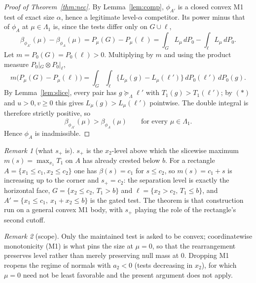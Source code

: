 \documentclass[12pt]{article}
\theoremstyle{remark}
\newtheorem{remark}{Remark}
\newcommand{\Lam}{\Lambda}
\newcommand{\sucL}{\succeq_\Lam}
\begin{document}
\begin{proof}[Proof of Theorem~\ref{thm:nec}]
By Lemma~\ref{lem:comp}, $\phi_{A'}$ is a closed convex M1 test of exact size $\alpha$, hence a legitimate level-$\alpha$ competitor. Its power minus that of $\phi_A$ at $\mu\in\Lam_1$ is, since the tests differ only on $G\cup\ell$,
\[
\beta_{\phi_{A'}}(\mu)-\beta_{\phi_A}(\mu)
=P_\mu(G)-P_\mu(\ell)
=\int_G L_\mu\,dP_0-\int_\ell L_\mu\,dP_0 .
\]
Let $m=P_0(G)=P_0(\ell)>0$. Multiplying by $m$ and using the product measure $P_0|_G\otimes P_0|_\ell$,
\[
m\big(P_\mu(G)-P_\mu(\ell)\big)
=\int_G\!\int_\ell \big\{L_\mu(g)-L_\mu(\ell')\big\}\,dP_0(\ell')\,dP_0(g).
\]
By Lemma~\ref{lem:slice}, every pair has $g\sucL\ell'$ with $T_1(g)>T_1(\ell')$; by $(\ast)$ and $u>0,v\ge0$ this gives $L_\mu(g)>L_\mu(\ell')$ pointwise. The double integral is therefore strictly positive, so
\[
\beta_{\phi_{A'}}(\mu)>\beta_{\phi_A}(\mu)\qquad\text{for every }\mu\in\Lam_1 .
\]
Hence $\phi_A$ is inadmissible.
\end{proof}

\begin{remark}[what $s_+$ is]
$s_+$ is the $x_2$-level above which the slicewise maximum $m(s)=\max_{x_1}T_1$ on $A$ has already crested below $b$. For a rectangle $A=\{x_1\le c_1,x_2\le c_2\}$ one has $\beta(s)=c_1$ for $s\le c_2$, so $m(s)=c_1+s$ is increasing up to the corner and $s_+=c_2$: the separation level is exactly the horizontal face, $G=\{x_2\le c_2,\,T_1>b\}$ and $\ell=\{x_2>c_2,\,T_1\le b\}$, and $A'=\{x_1\le c_1,\ x_1+x_2\le b\}$ is the gated test. The theorem is that construction run on a general convex M1 body, with $s_+$ playing the role of the rectangle's second cutoff.
\end{remark}

\begin{remark}[scope]
Only the maintained test is asked to be convex; coordinatewise monotonicity (M1) is what pins the size at $\mu=0$, so that the rearrangement preserves level rather than merely preserving null mass at $0$. Dropping M1 reopens the regime of normals with $a_2<0$ (tests decreasing in $x_2$), for which $\mu=0$ need not be least favorable and the present argument does not apply.
\end{remark}
\end{document}
